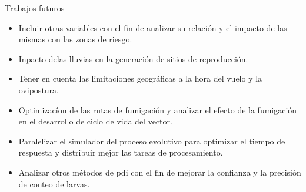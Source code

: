 \begin{frame}[t]{Trabajos futuros}
    \begin{center}
        \begin{itemize}
            \item Incluir otras variables con el fin de analizar su relación y el impacto de las mismas con las zonas de riesgo.

            \item Inpacto delas lluvias en la generación de sitios de reproducción.

            \item Tener en cuenta las limitaciones geográficas a la hora del vuelo y la ovipostura.

            \item Optimizacíon de las rutas de fumigación y analizar el efecto de la fumigación en el desarrollo de ciclo de vida del vector.

            \item Paralelizar el simulador del proceso evolutivo para optimizar el tiempo de respuesta y distribuir mejor las tareas de procesamiento.

            \item Analizar otros métodos de pdi con el fin de mejorar la confianza y la precisión de conteo de larvas.
        \end{itemize}
    \end{center}
\end{frame}
